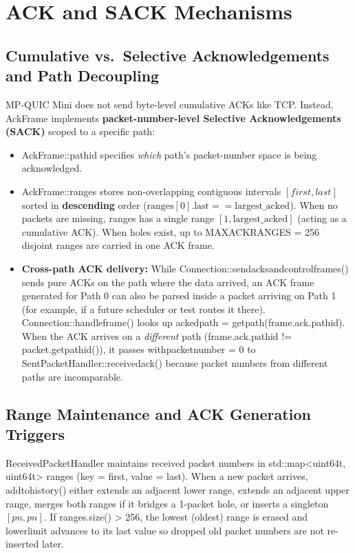 \documentclass[10pt,a4paper]{article}
\newcommand{\codeul}{\textunderscore\hspace{0pt}}
\DeclareRobustCommand{\code}[1]{{\ttfamily\let\_\codeul #1}}
\begin{document}
\section{ACK and SACK Mechanisms}

\subsection{Cumulative vs.\ Selective Acknowledgements and Path Decoupling}
MP-QUIC Mini does not send byte-level cumulative ACKs like TCP. Instead, \code{AckFrame} implements \textbf{packet-number-level Selective Acknowledgements (SACK)} scoped to a specific path:
\begin{itemize}
    \item \code{AckFrame::path\_id} specifies \emph{which} path's packet-number space is being acknowledged.
    \item \code{AckFrame::ranges} stores non-overlapping contiguous intervals $[first, last]$ sorted in \textbf{descending} order ($\text{ranges}[0].\text{last} == \text{largest\_acked}$). When no packets are missing, \code{ranges} has a single range $[1, \text{largest\_acked}]$ (acting as a cumulative ACK). When holes exist, up to \code{MAX\_ACK\_RANGES = 256} disjoint ranges are carried in one \code{ACK} frame.
    \item \textbf{Cross-path ACK delivery:} While \code{Connection::send\_acks\_and\_control\_frames()} sends pure ACKs on the path where the data arrived, an ACK frame generated for Path 0 can also be parsed inside a packet arriving on Path 1 (for example, if a future scheduler or test routes it there). \code{Connection::handle\_frame()} looks up \code{acked\_path = get\_path(frame.ack.path\_id)}. When the ACK arrives on a \emph{different} path (\code{frame.ack.path\_id != packet.get\_path\_id()}), it passes \code{with\_packet\_number = 0} to \code{SentPacketHandler::received\_ack()} because packet numbers from different paths are incomparable.
\end{itemize}

\subsection{Range Maintenance and ACK Generation Triggers}
\code{ReceivedPacketHandler} maintains received packet numbers in \code{std::map<uint64\_t, uint64\_t> ranges} (key = \code{first}, value = \code{last}). When a new packet arrives, \code{add\_to\_history()} either extends an adjacent lower range, extends an adjacent upper range, merges both ranges if it bridges a 1-packet hole, or inserts a singleton $[pn, pn]$. If \code{ranges.size() > 256}, the lowest (oldest) range is erased and \code{lower\_limit} advances to its \code{last} value so dropped old packet numbers are not re-inserted later.
\end{document}
